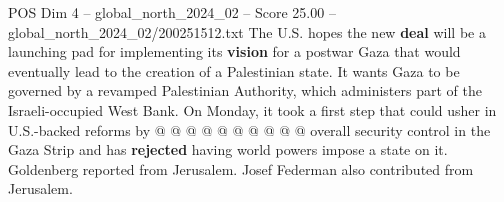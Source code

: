 \begin{textsample}{POS Dim 4 – global\_north\_2024\_02 – Score 25.00 – global\_north\_2024\_02/200251512.txt}
The U.S. hopes the new \textbf{deal} will be a launching pad for implementing its \textbf{vision} for a postwar Gaza that would eventually lead to the creation of a Palestinian state.
It wants Gaza to be governed by a revamped Palestinian Authority, which administers part of the Israeli-occupied West Bank.
On Monday, it took a first step that could usher in U.S.-backed reforms by @ @ @ @ @ @ @ @ @ @ overall security control in the Gaza Strip and has \textbf{rejected} having world powers impose a state on it.
Goldenberg reported from Jerusalem.
Josef Federman also contributed from Jerusalem.

\end{textsample}
